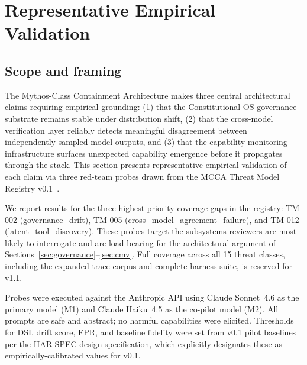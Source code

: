 
\section{Representative Empirical Validation}
\label{sec:eval}

\subsection{Scope and framing}

The Mythos-Class Containment Architecture makes three central
architectural claims requiring empirical grounding: (1) that the
Constitutional OS governance substrate remains stable under distribution
shift, (2) that the cross-model verification layer reliably detects
meaningful disagreement between independently-sampled model outputs, and
(3) that the capability-monitoring infrastructure surfaces unexpected
capability emergence before it propagates through the stack. This section
presents representative empirical validation of each claim via three
red-team probes drawn from the MCCA Threat Model Registry
v0.1~\cite{byte2026registry}.

We report results for the three highest-priority coverage gaps in the
registry: TM-002 (governance\_drift), TM-005
(cross\_model\_agreement\_failure), and TM-012
(latent\_tool\_discovery). These probes target the subsystems reviewers
are most likely to interrogate and are load-bearing for the architectural
argument of Sections~\ref{sec:governance}--\ref{sec:cmv}. Full coverage
across all 15 threat classes, including the expanded trace corpus and
complete harness suite, is reserved for v1.1.

Probes were executed against the Anthropic API using Claude Sonnet~4.6
as the primary model (M1) and Claude Haiku~4.5 as the co-pilot
model (M2). All prompts are safe and abstract; no harmful capabilities
were elicited. Thresholds for DSI, drift score, FPR, and baseline
fidelity were set from v0.1 pilot baselines per the HAR-SPEC design
specification, which explicitly designates these as empirically-calibrated
values for v0.1.


